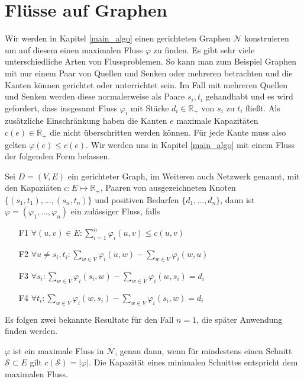\section{Flüsse auf Graphen}

Wir werden in Kapitel \ref{main_algo} einen gerichteten Graphen $\mathcal{N}$ konstruieren um auf diesem einen maximalen Fluss $\varphi$ zu finden. Es gibt sehr viele unterschiedliche Arten von Flussproblemen. So kann man zum Beispiel Graphen mit nur einem Paar von Quellen und Senken oder mehreren betrachten und die Kanten können gerichtet oder unterrichtet sein. Im Fall mit mehreren Quellen und Senken werden diese normalerweise als Paare $s_i,t_i$ gehandhabt und es wird gefordert, dass insgesamt Fluss $\varphi_i$ mit Stärke $d_i \in \mathbb{R}_+$ von $s_i$ zu $t_i$ fließt. Als zusätzliche Einschränkung haben die Kanten $e$ maximale Kapazitäten $c(e) \in \mathbb{R}_+$ die nicht überschritten werden können. Für jede Kante muss also gelten $\varphi(e) \leq c(e)$. Wir werden uns in Kapitel \ref{main_algo} mit einem Fluss der folgenden Form befassen.

\begin{definition}\label{def_multi_flow}
Sei $D=(V,E)$ ein gerichteter Graph, im Weiteren auch Netzwerk genannt, mit den Kapaziäten $c:E\mapsto\mathbb{R}_{+}$, Paaren von ausgezeichneten Knoten $\{(s_1,t_1), ... ,(s_n,t_n)\}$ und positiven Bedarfen $\{d_1, ... ,d_n\}$, dann ist $\varphi=(\varphi_1, ... ,\varphi_n)$ ein zulässiger Fluss, falls
\begin{itemize}
\item[F1] $\forall (u,v) \in E : \sum_{i=1}^{n}{\varphi_i(u,v)} \leq c(u,v) $
\item[F2] $ \forall u \neq s_i,t_i : \sum_{w \in V} \varphi_i(u,w) - \sum_{w \in V} \varphi_i(w,u) $
\item[F3] $ \forall s_i : \sum_{w \in V} \varphi_i(s_i,w) - \sum_{w \in V} \varphi_i(w,s_i) = d_i $
\item[F4] $ \forall t_i : \sum_{w \in V} \varphi_i(w,s_i) - \sum_{w \in V} \varphi_i(s_i,w) = d_i $
\end{itemize}
\end{definition}

Es folgen zwei bekannte Resultate für den Fall $n=1$, die später Anwendung finden werden.

\begin{theorem}
$\varphi$ ist ein maximale Fluss in $\mathcal{N}$, genau dann, wenn für mindestens einen Schnitt $\mathcal{S} \subset E$ gilt $c(\mathcal{S}) = |\varphi|$. Die Kapazität eines minimalen Schnittes entspricht dem maximalen Fluss.
\end{theorem}

